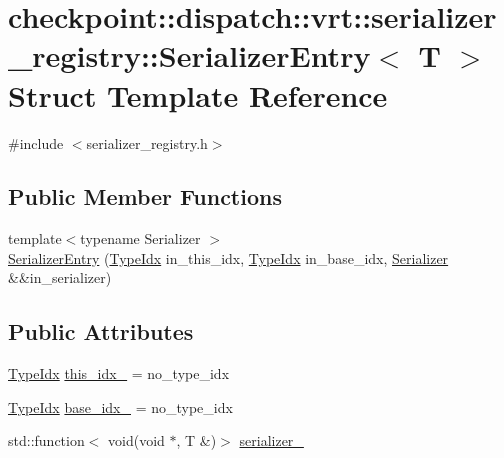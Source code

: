 \hypertarget{structcheckpoint_1_1dispatch_1_1vrt_1_1serializer__registry_1_1_serializer_entry}{}\section{checkpoint\+:\+:dispatch\+:\+:vrt\+:\+:serializer\+\_\+registry\+:\+:Serializer\+Entry$<$ T $>$ Struct Template Reference}
\label{structcheckpoint_1_1dispatch_1_1vrt_1_1serializer__registry_1_1_serializer_entry}


{\ttfamily \#include $<$serializer\+\_\+registry.\+h$>$}

\subsection*{Public Member Functions}
\begin{DoxyCompactItemize}
\item 
{\footnotesize template$<$typename Serializer $>$ }\\\hyperlink{structcheckpoint_1_1dispatch_1_1vrt_1_1serializer__registry_1_1_serializer_entry_acdb6f6442c02582096acab08ea25a0a8}{Serializer\+Entry} (\hyperlink{namespacecheckpoint_1_1dispatch_1_1vrt_acd3f9e6b091bcfbc23dc35ea8ef45d3b}{Type\+Idx} in\+\_\+this\+\_\+idx, \hyperlink{namespacecheckpoint_1_1dispatch_1_1vrt_acd3f9e6b091bcfbc23dc35ea8ef45d3b}{Type\+Idx} in\+\_\+base\+\_\+idx, \hyperlink{structcheckpoint_1_1_serializer}{Serializer} \&\&in\+\_\+serializer)
\end{DoxyCompactItemize}
\subsection*{Public Attributes}
\begin{DoxyCompactItemize}
\item 
\hyperlink{namespacecheckpoint_1_1dispatch_1_1vrt_acd3f9e6b091bcfbc23dc35ea8ef45d3b}{Type\+Idx} \hyperlink{structcheckpoint_1_1dispatch_1_1vrt_1_1serializer__registry_1_1_serializer_entry_a0fc5b0685579bc7a19343c03c4062e77}{this\+\_\+idx\+\_\+} = no\+\_\+type\+\_\+idx
\item 
\hyperlink{namespacecheckpoint_1_1dispatch_1_1vrt_acd3f9e6b091bcfbc23dc35ea8ef45d3b}{Type\+Idx} \hyperlink{structcheckpoint_1_1dispatch_1_1vrt_1_1serializer__registry_1_1_serializer_entry_a03d02cc3c3685644c5a784bf21241105}{base\+\_\+idx\+\_\+} = no\+\_\+type\+\_\+idx
\item 
std\+::function$<$ void(void $\ast$, T \&)$>$ \hyperlink{structcheckpoint_1_1dispatch_1_1vrt_1_1serializer__registry_1_1_serializer_entry_a964df1472ba3ce4732531609f448206d}{serializer\+\_\+}
\end{DoxyCompactItemize}


